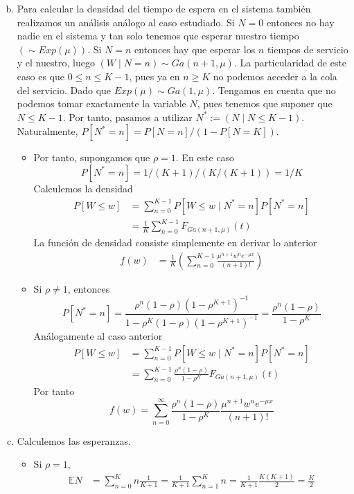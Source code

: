 \documentclass[twoside]{article}
\begin{document}
\begin{solucion}
\begin{enumerate}[(a)]
\begin{itemize}
$$$$
\end{itemize}
\item Para calcular la densidad del tiempo de espera en el sistema también realizamos un análisis análogo al caso estudiado. Si $N=0$ entonces no hay nadie en el sistema y tan solo tenemos que esperar nuestro tiempo $(\sim Exp(\mu))$. Si $N=n$ entonces hay que esperar los $n$ tiempos de servicio y el nuestro, luego $(W\mid N=n) \sim Ga(n+1,\mu)$. La particularidad de este caso es que $0\leq n \leq K-1$, pues ya en $n\geq K$ no podemos acceder a la cola del servicio. Dado que $Exp(\mu) \sim Ga(1,\mu)$. Tengamos en cuenta que no podemos tomar exactamente la variable $N$, pues tenemos que suponer que $N\leq K-1$. Por tanto, pasamos a utilizar $N^*:=(N\mid N\leq K-1)$. Naturalmente, $P[N^*=n] = P[N=n]/(1-P[N=K])$.
\begin{itemize}
\item Por tanto, supongamos que $\rho=1$. En este caso $$P[N^*=n] = 1/(K+1)/(K/(K+1)) = 1/K$$
Calculemos la densidad
\begin{align*}
P[W \leq w] &= \sum_{n=0}^{K-1} P[W \leq w \mid N^*=n]P[N^*=n]\\
&= \frac{1}{K}\sum_{n=0}^{K-1} F_{Ga(n+1,\mu)}(t) 
\end{align*}
La función de densidad consiste simplemente en derivar lo anterior
\begin{align*}
f(w) &= \frac{1}{K}\left(\sum_{n=0}^{K-1} \frac{\mu^{n+1} w^{n}e^{-\mu x}}{(n+1)!}\right)
\end{align*}
\item Si $\rho\neq 1$, entonces
$$
P[N^*=n] = \frac{\rho^n(1-\rho)(1-\rho^{K+1})^{-1}}{1-\rho^K(1-\rho)(1-\rho^{K+1})^{-1}} = \frac{\rho^n(1-\rho)}{1-\rho^K}
$$
Análogamente al caso anterior
\begin{align*}
P[W \leq w] &= \sum_{n=0}^{K-1} P[W \leq w \mid N^*=n]P[N^*=n]\\
&= \sum_{n=0}^{K-1} \frac{\rho^n(1-\rho)}{1-\rho^K} F_{Ga(n+1,\mu)}(t)
\end{align*}
Por tanto
$$
f(w) = \sum_{n=0}^\infty  \frac{\rho^n(1-\rho)}{1-\rho^K} \frac{\mu^{n+1} w^{n}e^{-\mu x}}{(n+1)!}
$$
\end{itemize}
\item Calculemos las esperanzas. 
\begin{itemize}
\item Si $\rho = 1$,
\begin{align*}
\mathbb{E}N & = \sum_{n=0}^K n \frac{1}{K+1}  = \frac{1}{K+1}\sum_{n=1}^K n = \frac{1}{K+1}\frac{K(K+1)}{2} = \frac{K}{2}

\end{align*}
\end{itemize}
\end{enumerate}
\end{solucion}
\end{document}
